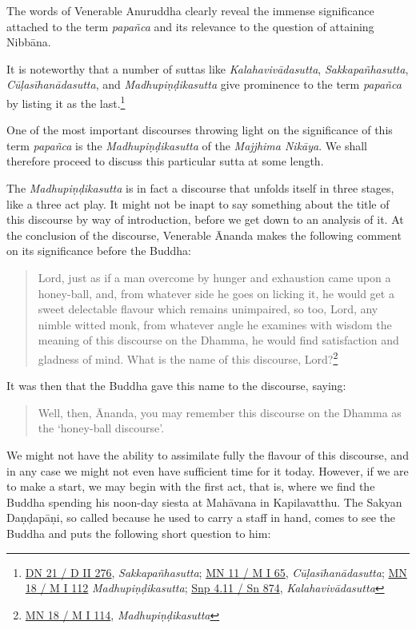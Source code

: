 The words of Venerable Anuruddha clearly reveal the immense significance attached to the term \emph{papañca} and its relevance to the question of attaining Nibbāna.

It is noteworthy that a number of suttas like \emph{Kalahavivādasutta}, \emph{Sakkapañhasutta}, \emph{Cūḷasīhanādasutta}, and \emph{Madhupiṇḍikasutta} give prominence to the term \emph{papañca} by listing it as the last.\footnote{\href{https://suttacentral.net/dn21/pli/ms}{DN 21 / D II 276}, \emph{Sakkapañhasutta}; \href{https://suttacentral.net/mn11/pli/ms}{MN 11 / M I 65}, \emph{Cūḷasīhanādasutta}; \href{https://suttacentral.net/mn18/pli/ms}{MN 18 / M I 112} \emph{Madhupiṇḍikasutta}; \href{https://suttacentral.net/snp4.11/pli/ms}{Snp 4.11 / Sn 874}, \emph{Kalahavivādasutta}}

One of the most important discourses throwing light on the significance of this term \emph{papañca} is the \emph{Madhupiṇḍikasutta} of the \emph{Majjhima Nikāya}. We shall therefore proceed to discuss this particular sutta at some length.

The \emph{Madhupiṇḍikasutta} is in fact a discourse that unfolds itself in three stages, like a three act play. It might not be inapt to say something about the title of this discourse by way of introduction, before we get down to an analysis of it. At the conclusion of the discourse, Venerable Ānanda makes the following comment on its significance before the Buddha:

\begin{quote}
Lord, just as if a man overcome by hunger and exhaustion came upon a honey-ball, and, from whatever side he goes on licking it, he would get a sweet delectable flavour which remains unimpaired, so too, Lord, any nimble witted monk, from whatever angle he examines with wisdom the meaning of this discourse on the Dhamma, he would find satisfaction and gladness of mind. What is the name of this discourse, Lord?\footnote{\href{https://suttacentral.net/mn18/pli/ms}{MN 18 / M I 114}, \emph{Madhupiṇḍikasutta}}
\end{quote}

It was then that the Buddha gave this name to the discourse, saying:

\begin{quote}
Well, then, Ānanda, you may remember this discourse on the Dhamma as the `honey-ball discourse'.
\end{quote}

We might not have the ability to assimilate fully the flavour of this discourse, and in any case we might not even have sufficient time for it today. However, if we are to make a start, we may begin with the first act, that is, where we find the Buddha spending his noon-day siesta at Mahāvana in Kapilavatthu. The Sakyan Daṇḍapāṇi, so called because he used to carry a staff in hand, comes to see the Buddha and puts the following short question to him:

